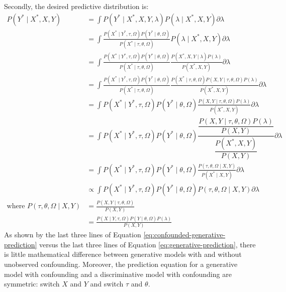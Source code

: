 \documentclass{article}
\begin{document}
Secondly, the desired predictive distribution is:
\begin{equation}
\label{eq:confounded-generative-prediction}
\begin{aligned}
P \left( Y^{*} \mid X^{*}, X, Y \right) &= \int P \left( Y^{*} \mid X^{*}, X, Y, \lambda \right) P \left( \lambda \mid X^{*}, X, Y \right) \partial \lambda\\
&= \int \frac{P \left( X^{*} \mid Y^{*}, \tau, \Omega \right) P \left( Y^{*} \mid \theta, \Omega \right)}{ P \left( X^{*} \mid \tau, \theta, \Omega \right) } P \left( \lambda \mid X^{*}, X, Y \right) \partial \lambda\\
&= \int \frac{P \left( X^{*} \mid Y^{*}, \tau, \Omega \right) P \left( Y^{*} \mid \theta, \Omega \right)}{ P \left( X^{*} \mid \tau, \theta, \Omega \right)} \frac{P \left( X^{*}, X, Y \mid \lambda \right) P \left( \lambda \right)}{P \left( X^{*}, X, Y \right)} \partial \lambda\\
&= \int \frac{P \left( X^{*} \mid Y^{*}, \tau, \Omega \right) P \left( Y^{*} \mid \theta, \Omega \right)}{ P \left( X^{*} \mid \tau, \theta, \Omega \right) } \frac{P \left( X^{*} \mid \tau, \theta, \Omega \right) P \left( X, Y \mid \tau, \theta, \Omega \right) P \left( \lambda \right)}{P \left( X^{*}, X, Y \right)} \partial \lambda\\
&= \int P \left( X^{*} \mid Y^{*}, \tau, \Omega \right) P \left( Y^{*} \mid \theta, \Omega \right) \frac{ P \left( X, Y \mid \tau, \theta, \Omega \right) P \left( \lambda \right)}{P \left( X^{*}, X, Y \right)} \partial \lambda\\
&= \int P \left( X^{*} \mid Y^{*}, \tau, \Omega \right) P \left( Y^{*} \mid \theta, \Omega \right) \dfrac{ \dfrac{P \left( X, Y \mid \tau, \theta, \Omega \right) P \left( \lambda \right)}{P \left( X, Y \right)}}{\dfrac{P \left( X^{*}, X, Y \right)}{P \left( X, Y \right)}} \partial \lambda\\
&= \int P \left( X^{*} \mid Y^{*}, \tau, \Omega \right) P \left( Y^{*} \mid \theta, \Omega \right) \frac{ P \left( \tau, \theta, \Omega \mid X, Y \right) }{P \left( X^{*} \mid X, Y \right)} \partial \lambda\\
&\propto \int P \left( X^{*} \mid Y^{*}, \tau, \Omega \right) P \left( Y^{*} \mid \theta, \Omega \right) P \left( \tau, \theta, \Omega \mid X, Y \right) \partial \lambda\\
\textrm{where } P \left( \tau, \theta, \Omega \mid X, Y \right) &= \frac{P \left( X, Y \mid \tau, \theta, \Omega \right)}{P \left( X, Y \right)}\\
&= \frac{P \left( X \mid Y, \tau, \Omega \right) P \left( Y \mid \theta, \Omega \right) P \left( \lambda \right)}{P \left( X, Y \right)}
\end{aligned}
\end{equation}
As shown by the last three lines of Equation \ref{eq:confounded-generative-prediction} versus the last three lines of Equation \ref{eq:generative-prediction}, there is little mathematical difference between generative models with and without unobserved confounding. Moreover, the prediction equation for a generative model with confounding and a discriminative model with confounding are symmetric: switch $X$ and $Y$ and switch $\tau$ and $\theta$.
\end{document}

